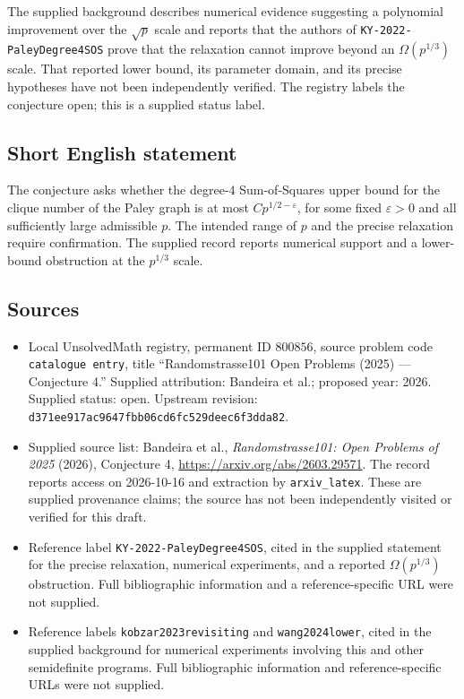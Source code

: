 \documentclass[11pt]{article}
\begin{document}
The supplied background describes numerical evidence suggesting a polynomial improvement over the \(\sqrt p\) scale and reports that the authors of \texttt{KY-2022-PaleyDegree4SOS} prove that the relaxation cannot improve beyond an \(\Omega(p^{1/3})\) scale. That reported lower bound, its parameter domain, and its precise hypotheses have not been independently verified. The registry labels the conjecture open; this is a supplied status label.
\subsection{Short English statement}
The conjecture asks whether the degree-\(4\) Sum-of-Squares upper bound for the clique number of the Paley graph is at most \(C p^{1/2-\varepsilon}\), for some fixed \(\varepsilon>0\) and all sufficiently large admissible \(p\). The intended range of \(p\) and the precise relaxation require confirmation. The supplied record reports numerical support and a lower-bound obstruction at the \(p^{1/3}\) scale.
\subsection{Sources}
\begin{itemize}
\item Local UnsolvedMath registry, permanent ID \(800856\), source problem code \texttt{catalogue entry}, title ``Randomstrasse101 Open Problems (2025) --- Conjecture 4.'' Supplied attribution: Bandeira et al.; proposed year: 2026. Supplied status: open. Upstream revision: \texttt{d371ee917ac9647fbb06cd6fc529deec6f3dda82}.
\item Supplied source list: Bandeira et al., \emph{Randomstrasse101: Open Problems of 2025} (2026), Conjecture 4, \url{https://arxiv.org/abs/2603.29571}. The record reports access on 2026-10-16 and extraction by \texttt{arxiv\_latex}. These are supplied provenance claims; the source has not been independently visited or verified for this draft.
\item Reference label \texttt{KY-2022-PaleyDegree4SOS}, cited in the supplied statement for the precise relaxation, numerical experiments, and a reported \(\Omega(p^{1/3})\) obstruction. Full bibliographic information and a reference-specific URL were not supplied.
\item Reference labels \texttt{kobzar2023revisiting} and \texttt{wang2024lower}, cited in the supplied background for numerical experiments involving this and other semidefinite programs. Full bibliographic information and reference-specific URLs were not supplied.
\end{itemize}
\end{document}
